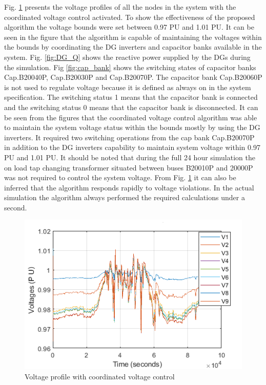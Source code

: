 Fig. \ref{fig:with_cvc} presents the voltage profiles of all the nodes in the system with the coordinated voltage control activated. To show the effectiveness of the proposed algorithm the voltage bounds were set between 0.97 PU and 1.01 PU. It can be seen in the figure that the algorithm is capable of maintaining the voltages within the bounds by coordinating the DG inverters and capacitor banks available in the system. Fig. \ref{fig:DG_Q} shows the reactive power supplied by the DGs during the simulation. Fig \ref{fig:cap_bank} shows the switching states of capacitor banks Cap.B20040P, Cap.B20030P and Cap.B20070P. The capacitor bank Cap.B20060P is not used to regulate voltage because it is defined as always on in the system specification. The switching status 1 means that the capacitor bank is connected and the switching status 0 means that the capacitor bank is disconnected. It can be seen from the figures that the coordinated voltage control algorithm was able to maintain the system voltage status within the bounds mostly by using the DG inverters. It required two switching operations from the cap bank Cap.B20070P in addition to the DG inverters capability to maintain system voltage within 0.97 PU and 1.01 PU. It should be noted that during the full 24 hour simulation the on load tap changing transformer situated between buses B20010P and 20000P was not required to control the system voltage. From Fig. \ref{fig:with_cvc} it can also be inferred that the algorithm responds rapidly to voltage violations. In the actual simulation the algorithm always performed the required calculations under a second.

\begin{figure}[!h]
\centering
\includegraphics[width=\linewidth]{figs/CVC/With_VVC.png}
\caption{Voltage profile with coordinated voltage control}
\label{fig:with_cvc}
\end{figure}

